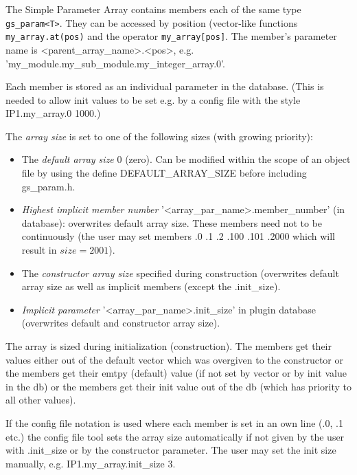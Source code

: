 The Simple Parameter Array contains members each of the same type \mbox{\lstinline|gs_param<T>|.} They can be accessed by position (vector-like functions \lstinline|my_array.at(pos)| and the operator \lstinline|my_array[pos]|. The member's parameter name is \textsf{\textless parent\_array\_name\textgreater.\textless pos\textgreater}, e.g. '\textsf{my\_module.my\_sub\_module.my\_integer\_array.0}'.

Each member is stored as an individual parameter in the database. (This is needed to allow init values to be set e.g. by a config file with the style \textsf{IP1.my\_array.0 1000}.)

The {\em array size} is set to one of the following sizes (with growing priority):
\begin{itemize}
	\item The {\em default array size} 0 (zero). \newline
		Can be modified within the scope of an object file by using the define
		\mbox{\sffamily DEFAULT\_ARRAY\_SIZE} before including \textsf{gs\_param.h}.
	\item {\em Highest implicit member number} '\textsf{\textless array\_par\_name\textgreater.member\_number}'
		(in database): overwrites default array size. These members need not to be continuously
		(the user may set members {\sffamily .0 .1 .2 .100 .101 .2000} which will result in $size = 2001$).
	\item The {\em constructor array size} specified during construction
		 (overwrites default array size as well as implicit members (except the \textsf{.init\_size}).
	\item {\em Implicit parameter} '\textsf{\textless array\_par\_name\textgreater.init\_size}' in plugin database
		 (overwrites default and constructor array size).
\end{itemize}

The array is sized during initialization (construction). The members get their values either out of the default vector which was overgiven to the constructor or the members get their emtpy (default) value (if not set by vector or by init value in the db) or the members get their init value out of the db (which has priority to all other values).

If the config file notation is used where each member is set in an own line (.0, .1 etc.) the config file tool sets the array size automatically if not given by the user with \textsf{.init\_size} or by the constructor parameter. The user may set the init size manually, e.g. \textsf{IP1.my\_array.init\_size 3}.

